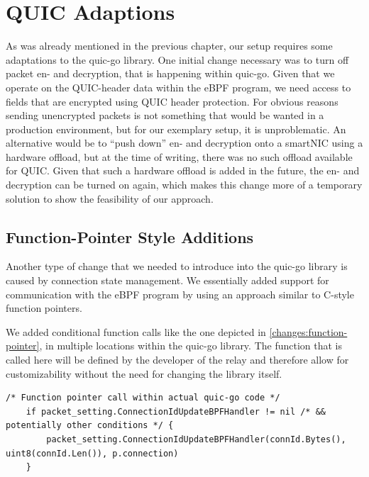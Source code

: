 \section{QUIC Adaptions}\label{sec:quic_adaptions}
As was already mentioned in the previous chapter, our setup requires some adaptations
to the quic-go library.
One initial change necessary was to turn off packet en- and decryption, 
that is happening within quic-go.
Given that we operate on the QUIC-header data within the eBPF program, we need access 
to fields that are encrypted using QUIC header protection.
For obvious reasons sending unencrypted packets is not something that would be wanted in 
a production environment, but for our exemplary setup, it is unproblematic. 
An alternative would be to ``push down'' en- and decryption onto a smartNIC using a 
hardware offload, but at the time of writing, there was no such offload available for QUIC\@. 
Given that such a hardware offload is added in the future, the en- and decryption can be
turned on again, which makes this change more of a temporary solution to show the feasibility
of our approach.

\subsection{Function-Pointer Style Additions}
Another type of change that we needed to introduce into the quic-go library is caused by 
connection state management.
We essentially added support for communication with the eBPF program by using an 
approach similar to C-style function pointers.

We added conditional function calls like the one depicted in 
\autoref{changes:function-pointer}, in multiple locations 
within the quic-go library.
The function that is called here will be defined by the developer of the relay and 
therefore allow for customizability without the need for changing the library itself.

\vspace{0.5cm}
\noindent\begin{minipage}{\textwidth}
\begin{lstlisting}[style=GoStyle, label=changes:function-pointer, caption=An example of a function-pointer addition to the quic-go library.]
    /* Function pointer call within actual quic-go code */
    if packet_setting.ConnectionIdUpdateBPFHandler != nil /* && potentially other conditions */ {
	    packet_setting.ConnectionIdUpdateBPFHandler(connId.Bytes(), uint8(connId.Len()), p.connection)
	}
\end{lstlisting}
\end{minipage}

